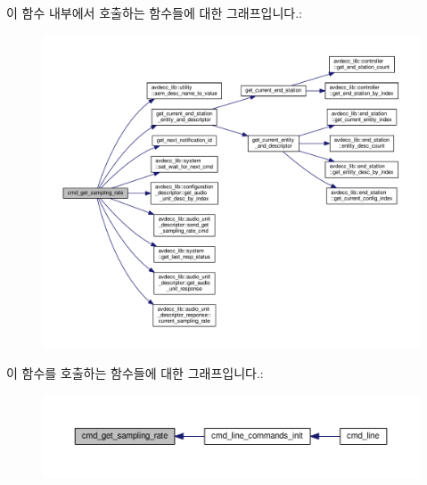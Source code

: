 이 함수 내부에서 호출하는 함수들에 대한 그래프입니다.\+:
\nopagebreak
\begin{figure}[H]
\begin{center}
\leavevmode
\includegraphics[width=350pt]{classcmd__line_a301f6afb5cbc6caa761c11096f9d5c96_cgraph}
\end{center}
\end{figure}




이 함수를 호출하는 함수들에 대한 그래프입니다.\+:
\nopagebreak
\begin{figure}[H]
\begin{center}
\leavevmode
\includegraphics[width=350pt]{classcmd__line_a301f6afb5cbc6caa761c11096f9d5c96_icgraph}
\end{center}
\end{figure}


